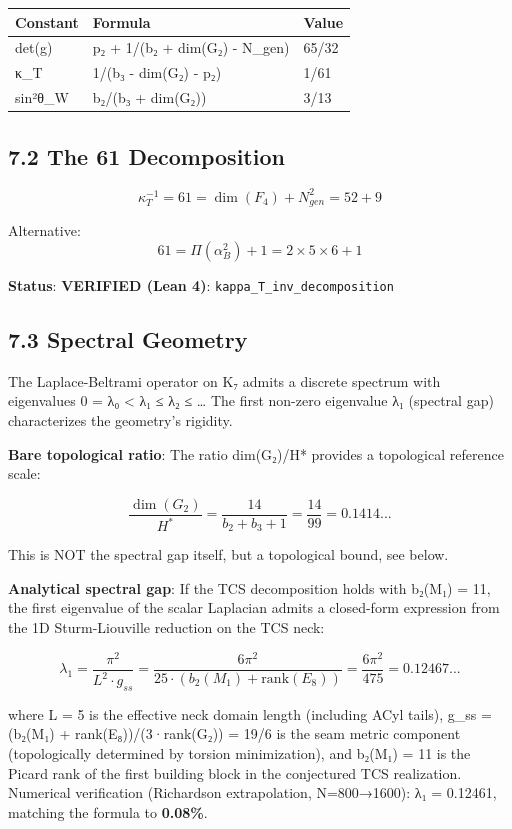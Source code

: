 \documentclass[11pt,a4paper]{article}
\begin{document}
\begin{longtable}[]{@{}lll@{}}
\toprule\noalign{}
Constant & Formula & Value \\
\midrule\noalign{}
\endhead
\bottomrule\noalign{}
\endlastfoot
det(g) & p₂ + 1/(b₂ + dim(G₂) - N\_\allowbreak{}gen) & 65/32 \\
κ\_\allowbreak{}T & 1/(b₃ - dim(G₂) - p₂) & 1/61 \\
sin²θ\_\allowbreak{}W & b₂/(b₃ + dim(G₂)) & 3/13 \\
\end{longtable}

\subsection{7.2 The 61 Decomposition}\label{the-61-decomposition}

\[\kappa_T^{-1} = 61 = \dim(F_4) + N_{gen}^2 = 52 + 9\]

Alternative: \[61 = \Pi(\alpha^2_B) + 1 = 2 \times 5 \times 6 + 1\]

\textbf{Status}: \textbf{VERIFIED (Lean 4)}: \texttt{kappa\_\allowbreak{}T\_\allowbreak{}inv\_\allowbreak{}decomposition}

\subsection{7.3 Spectral Geometry}\label{spectral-geometry}

The Laplace-Beltrami operator on K₇ admits a discrete spectrum with eigenvalues 0 = λ₀ \textless{} λ₁ ≤ λ₂ ≤ \ldots{} The first non-zero eigenvalue λ₁ (spectral gap) characterizes the geometry's rigidity.

\textbf{Bare topological ratio}: The ratio dim(G₂)/H* provides a topological reference scale:

\[\frac{\dim(G_2)}{H^*} = \frac{14}{b_2 + b_3 + 1} = \frac{14}{99} = 0.1414...\]

This is NOT the spectral gap itself, but a topological bound, see below.

\textbf{Analytical spectral gap}: If the TCS decomposition holds with b₂(M₁) = 11, the first eigenvalue of the scalar Laplacian admits a closed-form expression from the 1D Sturm-Liouville reduction on the TCS neck:

\[\boxed{\lambda_1 = \frac{\pi^2}{L^2 \cdot g_{ss}} = \frac{6\pi^2}{25 \cdot (b_2(M_1) + \mathrm{rank}(E_8))} = \frac{6\pi^2}{475} = 0.12467...}\]

where L = 5 is the effective neck domain length (including ACyl tails), g\_\allowbreak{}ss = (b₂(M₁) + rank(E₈))/(3·rank(G₂)) = 19/6 is the seam metric component (topologically determined by torsion minimization), and b₂(M₁) = 11 is the Picard rank of the first building block in the conjectured TCS realization. Numerical verification (Richardson extrapolation, N=800→1600): λ₁ = 0.12461, matching the formula to \textbf{0.08\%}.
\end{document}
